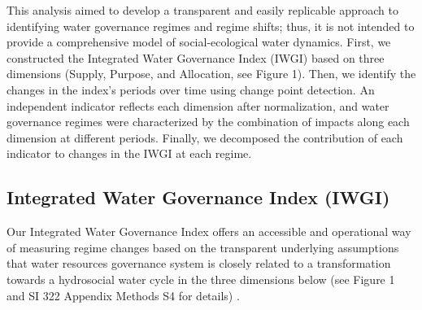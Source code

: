 This analysis aimed to develop a transparent and easily replicable approach to identifying water governance regimes and regime shifts; thus, it is not intended to provide a comprehensive model of social-ecological water dynamics. First, we constructed the Integrated Water Governance Index (IWGI) based on three dimensions (Supply, Purpose, and Allocation, see Figure 1). Then, we identify the changes in the index's periods over time using change point detection. An independent indicator reflects each dimension after normalization, and water governance regimes were characterized by the combination of impacts along each dimension at different periods. Finally, we decomposed the contribution of each indicator to changes in the IWGI at each regime.

\subsection{Integrated Water Governance Index (IWGI)}

Our Integrated Water Governance Index offers an accessible and operational way of measuring regime changes based on the transparent underlying assumptions that water resources governance system is closely related to a transformation towards a hydrosocial water cycle in the three dimensions below (see Figure 1 and SI 322 Appendix Methods S4 for details)
\cite{abbottwatercycleAnthropocene2019,leviaHomogenizationterrestrialwater2020,steffenTrajectoriesEarthSystem2018}.

